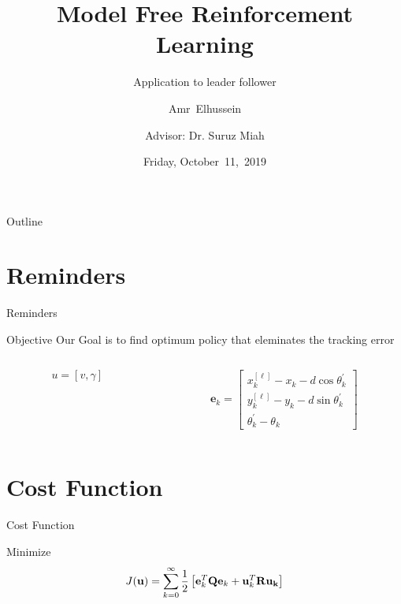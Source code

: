 \documentclass{beamer}
\title{Model Free Reinforcement Learning}
\subtitle{Application to leader follower}
\author[A.Elhussein]{Amr~Elhussein  \\\and
Advisor: Dr. Suruz Miah}
\institute[Bradley University] %
{
  Department of Electrical and Computer Engineering\\
  Bradley University\\
  1501 W. Bradley Avenue\\
  Peoria, IL, 61625, USA
}
\date[October~11,~2019]{Friday, October~11,~2019}
\begin{document}
\begin{frame}
  \titlepage
\end{frame}

\begin{frame}{Outline}
  \tableofcontents
\end{frame}


\section{Reminders}
\begin{frame}{Reminders}
\begin{block}{Objective}
Our Goal is to find optimum policy that eleminates the tracking error
\end{block}
\begin{columns}
\begin{column}{0.5\textwidth}
\begin{equation}
u = \left[v, \gamma\right]
\end{equation}
\end{column}
\begin{column}{0.5\textwidth}
\begin{equation}
\mathbf{e}_k = \begin{bmatrix}
     x_k^{[\ell]} - x_k - d\cos\theta_k^{'}
    \\ y_k^{[\ell]} - y_k - d\sin\theta_k^{'}
    \\ \theta_k^{'} - \theta_k
  \end{bmatrix}
\end{equation} 
\end{column}
\end{columns}
\end{frame}
\section{Cost Function}
\begin{frame}{Cost Function}
\begin{block}{Minimize}
\begin{equation}
J({\bf u}) = \sum_{k=0}^\infty \frac{1}{2}\left[{\bf e}_k^T{\bf Q}{\bf e}_k + {\bf u}_k^T{\bf R}{\bf u_k}\right]
\end{equation}
\end{block}
\end{frame}
\end{document}
